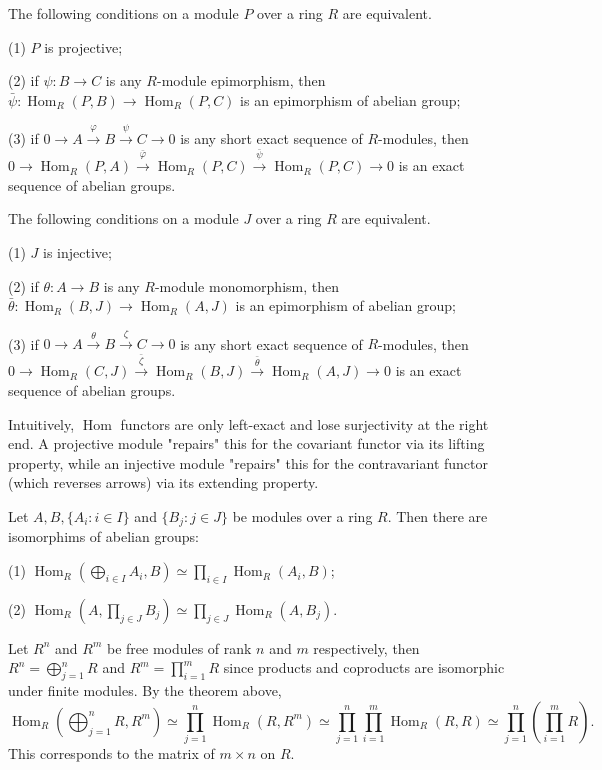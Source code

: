 \documentclass{article}
\DeclareMathOperator{\Hom}{Hom}
\begin{document}
\begin{corollary}
    The following conditions on a module $P$ over a ring $R$ are equivalent.

    (1) $P$ is projective;

    (2) if $\psi:B\to C$ is any $R$-module epimorphism, then $\bar{\psi}:\Hom_{R}(P, B)\to \Hom_{R}(P, C)$ is an epimorphism of abelian group;

    (3) if $0\to A\xrightarrow{\varphi}B\xrightarrow{\psi}C\to 0$ is any short exact sequence of $R$-modules, then $0\to \Hom_{R}(P, A)\xrightarrow{\bar{\varphi}} \Hom_{R}(P, C)\xrightarrow{\bar{\psi}}\Hom_{R}(P, C)\to 0$ is an exact sequence of abelian groups.
\end{corollary}

\begin{corollary}
    The following conditions on a module $J$ over a ring $R$ are equivalent.

    (1) $J$ is injective;

    (2) if $\theta:A\to B$ is any $R$-module monomorphism, then $\bar{\theta}:\Hom_{R}(B, J)\to \Hom_{R}(A, J)$ is an epimorphism of abelian group;

    (3) if $0\to A\xrightarrow{\theta}B\xrightarrow{\zeta}C\to 0$ is any short exact sequence of $R$-modules, then $0\to \Hom_{R}(C, J)\xrightarrow{\bar{\zeta}} \Hom_{R}(B, J)\xrightarrow{\bar{\theta}}\Hom_{R}(A, J)\to 0$ is an exact sequence of abelian groups.
\end{corollary}


Intuitively, $\Hom$ functors are only left-exact and lose surjectivity at the right end. A projective module "repairs" this for the covariant functor via its lifting property, while an injective module "repairs" this for the contravariant functor (which reverses arrows) via its extending property.

\begin{theorem}
    Let $A,B,\{A_{i}:i \in I\}$ and $\{B_{j}:j \in J\}$ be modules over a ring $R$. Then there are isomorphims of abelian groups:

    (1) $\Hom_{R}(\bigoplus_{i \in I}A_{i}, B)\simeq \prod_{i \in I} \Hom_{R}(A_{i}, B)  $;

    (2) $\Hom_{R}(A, \prod_{j \in J}B_{j}  )\simeq \prod_{j \in J}\Hom_{R}(A, B_{j})  $.
\end{theorem}

\begin{example}
    Let $R^n$ and $R^m$ be free modules of rank $n$ and $m$ respectively, then $R^n = \bigoplus_{j=1}^n R$ and $R^m = \prod_{i=1}^m R$ since products and coproducts are isomorphic under finite modules. By the theorem above, $$\Hom_R\left( \bigoplus_{j=1}^n R, R^m \right) \simeq \prod_{j=1}^n \Hom_R(R, R^m)\simeq \prod_{j=1}^{n} \prod_{i=1}^{m} \Hom_{R}(R, R) \simeq  \prod_{j=1}^{n} \left( \prod_{i=1}^{m} R\right). $$ This corresponds to the matrix of $m \times n$ on $R$.
\end{example}
\end{document}
